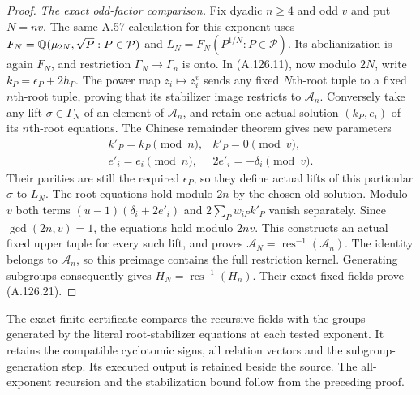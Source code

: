\begin{proof}
\emph{The exact odd-factor comparison.}
Fix dyadic $n\ge4$ and odd $v$ and put $N=nv$.
The same A.57 calculation for this exponent uses
$F_N=\mathbb Q(\mu_{2N},\sqrt P:P\in\mathcal P)$ and
$L_N=F_N(P^{1/N}:P\in\mathcal P)$.
Its abelianization is again $F_N$, and restriction
$\Gamma_N\to\Gamma_n$ is onto.
In (A.126.11), now modulo $2N$, write
$k_P=\epsilon_P+2h_P$.
The power map $z_i\mapsto z_i^v$ sends any fixed
$N$th-root tuple to a fixed $n$th-root tuple,
proving that its stabilizer image restricts to
$\mathcal A_n$.
Conversely take any lift $\sigma\in\Gamma_N$ of an
element of $\mathcal A_n$, and retain one actual
solution $(k_P,e_i)$ of its $n$th-root equations.
The Chinese remainder theorem gives new parameters
\[
 \begin{array}{lll}
 k'_P=k_P\pmod n,& k'_P=0\pmod v,\\
 e'_i=e_i\pmod n,& 2e'_i=-\delta_i\pmod v.
 \end{array}
\tag{A.126.22}
\]
Their parities are still the required $\epsilon_P$,
so they define actual lifts of this particular
$\sigma$ to $L_N$.
The root equations hold modulo $2n$ by the chosen
old solution.  Modulo $v$ both terms
$(u-1)(\delta_i+2e'_i)$ and $2\sum_Pw_{iP}k'_P$
vanish separately.  Since $\gcd(2n,v)=1$, the
equations hold modulo $2nv$.
This constructs an actual fixed upper tuple for
every such lift, and proves
$\mathcal A_N=\operatorname{res}^{-1}(\mathcal A_n)$.
The identity belongs to $\mathcal A_n$, so this
preimage contains the full restriction kernel.
Generating subgroups consequently gives
$H_N=\operatorname{res}^{-1}(H_n)$.
Their exact fixed fields prove (A.126.21).
\end{proof}

\noindent The exact finite certificate
compares the recursive fields with the groups generated
by the literal root-stabilizer equations at each tested
exponent.  It retains the compatible cyclotomic signs,
all relation vectors and the subgroup-generation step.
Its executed output is retained beside the source.
The all-exponent recursion and the stabilization bound
follow from the preceding proof.

